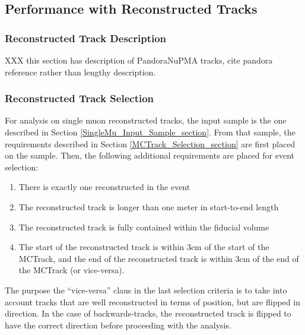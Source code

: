 \subsection{Performance with Reconstructed Tracks}
\subsubsection{Reconstructed Track Description}\label{RecoTrack_section}
XXX this section has description of PandoraNuPMA tracks, cite pandora reference rather than lengthy description.

\subsubsection{Reconstructed Track Selection}\label{RecoTrack_Selection_section}
For analysis on single muon reconstructed tracks, the input sample is the one described in Section \ref{SingleMu_Input_Sample_section}. From that sample, the requirements described in Section \ref{MCTrack_Selection_section} are first placed on the sample. Then, the following additional requirements are placed for event selection:
\begin{enumerate}
	\item There is exactly one reconstructed in the event
	\item The reconstructed track is longer than one meter in start-to-end length
	\item The reconstructed track is fully contained within the fiducial volume
	\item The start of the reconstructed track is within 3cm of the start of the {\sc MCTrack}, and the end of the reconstructed track is within 3cm of the end of the {\sc MCTrack} (or vice-versa).
\end{enumerate}
The purpose the ``vice-versa'' claus in the last selection criteria is to take into account tracks that are well reconstructed in terms of position, but are flipped in direction. In the case of backwards-tracks, the reconstructed track is flipped to have the correct direction before proceeding with the analysis.

